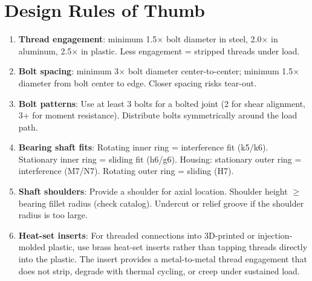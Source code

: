 \documentclass[11pt,letterpaper,twoside,openany]{book}
\begin{document}
\FloatBarrier
\section{Design Rules of Thumb}

\begin{enumerate}[leftmargin=1.5em]
\item \textbf{Thread engagement}: minimum 1.5$\times$ bolt diameter in steel, 2.0$\times$ in aluminum, 2.5$\times$ in plastic. Less engagement = stripped threads under load.
\item \textbf{Bolt spacing}: minimum 3$\times$ bolt diameter center-to-center; minimum 1.5$\times$ diameter from bolt center to edge. Closer spacing risks tear-out.
\item \textbf{Bolt patterns}: Use at least 3 bolts for a bolted joint (2 for shear alignment, 3+ for moment resistance). Distribute bolts symmetrically around the load path.
\item \textbf{Bearing shaft fits}: Rotating inner ring = interference fit (k5/k6). Stationary inner ring = sliding fit (h6/g6). Housing: stationary outer ring = interference (M7/N7). Rotating outer ring = sliding (H7).
\item \textbf{Shaft shoulders}: Provide a shoulder for axial location. Shoulder height $\geq$ bearing fillet radius (check catalog). Undercut or relief groove if the shoulder radius is too large.
\item \textbf{Heat-set inserts}: For threaded connections into 3D-printed or injection-molded plastic, use brass heat-set inserts rather than tapping threads directly into the plastic. The insert provides a metal-to-metal thread engagement that does not strip, degrade with thermal cycling, or creep under sustained load.
\end{enumerate}

\FloatBarrier
\end{document}
